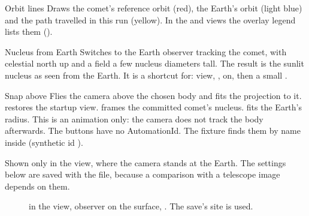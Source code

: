 \begin{uipanel}
\begin{uiproperty}[key=orbit-lines, id=OrbitLinesCheckBox, type={check box}, default={on},
    effect=display, saved=prefs, help=Tabs_Settings_HelpViewOrbitLines]{Orbit lines}
Draws the comet's reference orbit (red), the Earth's orbit (light blue) and the path
travelled in this run (yellow). In the  and  views the overlay
legend lists them ().
\end{uiproperty}

\begin{uiproperty}[key=nucleus-from-earth, id=ViewNucleusFromEarthButton, type={button},
    effect=action, visible={always; enabled once a comet is committed}, %
    help=Tabs_Settings_HelpViewNucleusFromEarth]{Nucleus from Earth}
Switches to the Earth observer tracking the comet, with celestial north up and a field a few
nucleus diameters tall. The result is the sunlit nucleus as seen from the Earth. It is a
shortcut for:  view, ,  on, then a
small .
\end{uiproperty}

\begin{uiproperty}[key=snap-above, id=SnapAbove, type={three buttons},
    range={\uilabel{Sun}, \uilabel{Comet}, \uilabel{Earth}}, effect=action,
    visible={\uilabel{Orbit} view}]{Snap above}
Flies the camera above the chosen body and fits the projection to it.  restores
the startup view.  frames the committed comet's nucleus.  fits
the Earth's radius. This is an animation only: the camera does not track the body
afterwards. The buttons have no AutomationId. The fixture finds them by name inside
 (synthetic id ).
\end{uiproperty}


Shown only in the  view, where the camera stands at the Earth. The settings
below are saved with the file, because a comparison with a telescope image depends on them.

\begin{figure}[htbp]
  \centering
  \caption{ in the  view, observer on the
    surface, . The save's site is used.}
  \label{fig:settings-viewport-observer}
\end{figure}


\end{uipanel}
